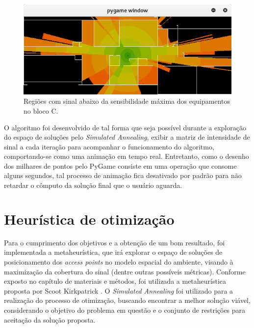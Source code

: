 \documentclass[
	12pt,				%
	twoside,			%
	a4paper,			%
	english,			%
	french,				%
	spanish,			%
	brazil				%
	]{abntex2}
\begin{document}
\begin{figure}[!ht]
    \caption{\label{simulacao_sensibilidade} Regiões com sinal abaixo da sensibilidade máxima dos equipamentos no bloco C.}
    \begin{center}
        \includegraphics[scale=0.7]{imagens/sumulacao-sensibilidade.jpg}
    \end{center}
\end{figure}

O algoritmo foi desenvolvido de tal forma que seja possível durante a
exploração do espaço de soluções pelo \emph{Simulated Annealing}, exibir
a matriz de intensidade de sinal a cada iteração para acompanhar o
funcionamento do algoritmo, comportando-se como uma animação em tempo
real. Entretanto, como o desenho dos milhares de pontos pelo PyGame
consiste em uma operação que consome alguns segundos, tal processo de
animação fica desativado por padrão para não retardar o cômputo da
solução final que o usuário aguarda.

\section{Heurística de
otimização}\label{heuruxedstica-de-otimizauxe7uxe3o}

Para o cumprimento dos objetivos e a obtenção de um bom resultado, foi
implementada a metaheurística, que irá explorar o espaço de soluções de
posicionamento dos \emph{access points} no modelo espacial do ambiente,
visando à maximização da cobertura do sinal (dentre outras possíveis
métricas). Conforme exposto no capítulo de materiais e métodos, foi
utilizada a metaheurística proposta por Scoot Kirkpatrick
\cite{PATRICK}. O \emph{Simulated Annealing} foi utilizado para a
realização do processo de otimização, buscando encontrar a melhor
solução viável, considerando o objetivo do problema em questão e o
conjunto de restrições para aceitação da solução proposta.
\end{document}
